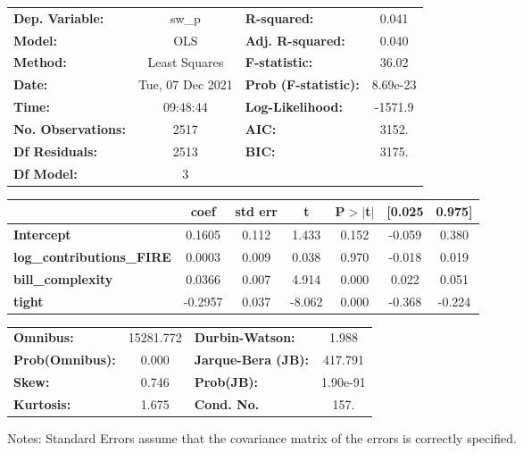 \begin{center}
\begin{tabular}{lclc}
\toprule
\textbf{Dep. Variable:}           &      sw\_p       & \textbf{  R-squared:         } &     0.041   \\
\textbf{Model:}                   &       OLS        & \textbf{  Adj. R-squared:    } &     0.040   \\
\textbf{Method:}                  &  Least Squares   & \textbf{  F-statistic:       } &     36.02   \\
\textbf{Date:}                    & Tue, 07 Dec 2021 & \textbf{  Prob (F-statistic):} &  8.69e-23   \\
\textbf{Time:}                    &     09:48:44     & \textbf{  Log-Likelihood:    } &   -1571.9   \\
\textbf{No. Observations:}        &        2517      & \textbf{  AIC:               } &     3152.   \\
\textbf{Df Residuals:}            &        2513      & \textbf{  BIC:               } &     3175.   \\
\textbf{Df Model:}                &           3      & \textbf{                     } &             \\
\bottomrule
\end{tabular}
\begin{tabular}{lcccccc}
                                  & \textbf{coef} & \textbf{std err} & \textbf{t} & \textbf{P$> |$t$|$} & \textbf{[0.025} & \textbf{0.975]}  \\
\midrule
\textbf{Intercept}                &       0.1605  &        0.112     &     1.433  &         0.152        &       -0.059    &        0.380     \\
\textbf{log\_contributions\_FIRE} &       0.0003  &        0.009     &     0.038  &         0.970        &       -0.018    &        0.019     \\
\textbf{bill\_complexity}         &       0.0366  &        0.007     &     4.914  &         0.000        &        0.022    &        0.051     \\
\textbf{tight}                    &      -0.2957  &        0.037     &    -8.062  &         0.000        &       -0.368    &       -0.224     \\
\bottomrule
\end{tabular}
\begin{tabular}{lclc}
\textbf{Omnibus:}       & 15281.772 & \textbf{  Durbin-Watson:     } &    1.988  \\
\textbf{Prob(Omnibus):} &    0.000  & \textbf{  Jarque-Bera (JB):  } &  417.791  \\
\textbf{Skew:}          &    0.746  & \textbf{  Prob(JB):          } & 1.90e-91  \\
\textbf{Kurtosis:}      &    1.675  & \textbf{  Cond. No.          } &     157.  \\
\bottomrule
\end{tabular}
\end{center}

Notes: \newline
 [1] Standard Errors assume that the covariance matrix of the errors is correctly specified.